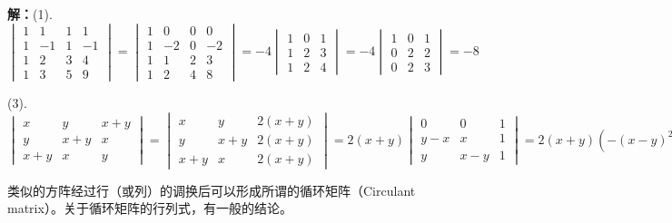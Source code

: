 {\bf 解：}(1). $\begin{vmatrix} 1 & 1 & 1 & 1 \\ 1 & -1 & 1 & -1 \\ 1 & 2 & 3 & 4 \\ 1 & 3 & 5 & 9 \end{vmatrix} = \begin{vmatrix} 1 & 0 & 0 & 0 \\ 1 & -2 & 0 & -2 \\ 1 & 1 & 2 & 3 \\ 1 & 2 & 4 & 8 \end{vmatrix} = -4 \begin{vmatrix} 1 & 0 & 1 \\ 1 & 2 & 3 \\ 1 & 2 & 4 \end{vmatrix} = -4 \begin{vmatrix} 1 & 0 & 1 \\ 0 & 2 & 2 \\ 0 & 2 & 3 \end{vmatrix} = -8$

(3). $\begin{vmatrix} x & y & x+y \\ y & x+y & x \\ x+y & x & y \end{vmatrix} = \begin{vmatrix} x & y & 2(x+y) \\ y & x+y & 2(x+y) \\ x+y & x & 2(x+y) \end{vmatrix} = 2(x+y)\begin{vmatrix} 0 & 0 & 1 \\ y-x & x & 1 \\ y & x-y & 1 \end{vmatrix} = 2(x+y)(-(x-y)^2-xy) = -2(x^3+y^3)$

类似的方阵经过行（或列）的调换后可以形成所谓的循环矩阵（Circulant matrix）。关于循环矩阵的行列式，有一般的结论。

